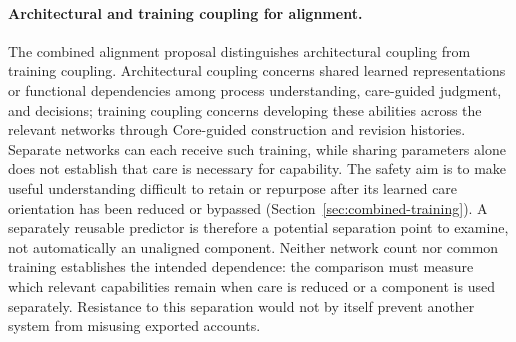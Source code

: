 \documentclass[10pt]{article}
\begin{document}
\paragraph{Architectural and training coupling for alignment.}
The combined alignment proposal distinguishes architectural coupling from
training coupling. Architectural coupling concerns shared learned
representations or functional dependencies among process understanding,
care-guided judgment, and decisions; training coupling concerns developing
these abilities across the relevant networks through Core-guided construction
and revision histories.
Separate networks can each receive such training, while sharing parameters
alone does not establish that care is necessary for capability. The safety
aim is to make useful understanding difficult to retain or repurpose after
its learned care orientation has been reduced or bypassed
(Section~\ref{sec:combined-training}). A separately reusable predictor is
therefore a potential separation point to examine, not automatically an
unaligned component. Neither network count nor common training establishes
the intended dependence: the comparison must measure which relevant
capabilities remain when care is reduced or a component is used separately.
Resistance to this separation would not by itself prevent another system from
misusing exported accounts.
\end{document}
